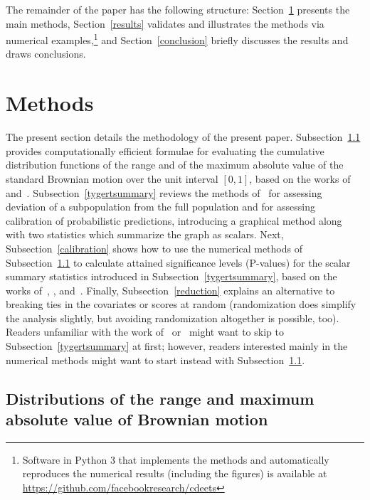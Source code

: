 \documentclass[12pt]{article}
\begin{document}
The remainder of the paper has the following structure:
Section~\ref{methods} presents the main methods,
Section~\ref{results} validates and illustrates the methods
via numerical examples,\footnote{Software in Python 3 that implements
the methods and automatically reproduces the numerical results
(including the figures) is available
at \url{https://github.com/facebookresearch/cdeets}}
and Section~\ref{conclusion} briefly discusses
the results and draws conclusions.



\section{Methods}
\label{methods}

The present section details the methodology of the present paper.
Subsection~\ref{distributions} provides computationally efficient formulae
for evaluating the cumulative distribution functions
of the range and of the maximum absolute value of the standard Brownian motion
over the unit interval $[0, 1]$, based on the works of~\citet{feller}
and~\citet{darling-siegert}.
Subsection~\ref{tygertsummary} reviews the methods
of~\citet{tygert_full} for assessing deviation of a subpopulation
from the full population and for assessing calibration
of probabilistic predictions, introducing a graphical method
along with two statistics which summarize the graph as scalars.
Next, Subsection~\ref{calibration} shows how to use
the numerical methods of Subsection~\ref{distributions}
to calculate attained significance levels (P-values)
for the scalar summary statistics introduced in Subsection~\ref{tygertsummary},
based on the works of~\citet{delgado}, \citet{diebolt}, and~\citet{stute}.
Finally, Subsection~\ref{reduction} explains an alternative to breaking ties
in the covariates or scores at random
(randomization does simplify the analysis slightly,
but avoiding randomization altogether is possible, too).
Readers unfamiliar with the work of~\citet{tygert_full} or~\citet{tygert_two}
might want to skip to Subsection~\ref{tygertsummary} at first; however,
readers interested mainly in the numerical methods might want to start instead
with Subsection~\ref{distributions}.



\subsection{Distributions of the range and maximum absolute value
of Brownian motion}
\label{distributions}
\end{document}
